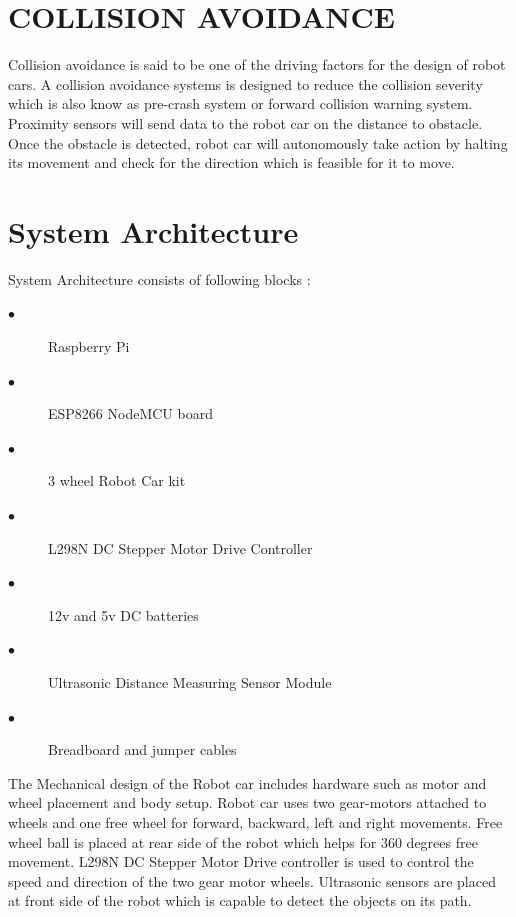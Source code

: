 \documentclass[sigconf]{acmart}
\begin{document}
\section{COLLISION AVOIDANCE}
Collision avoidance is said to be one of the driving factors for the design of robot cars. A collision avoidance systems is designed to reduce the collision severity which is also know as pre-crash system or forward collision warning system. Proximity sensors will send data to the robot car on the distance to obstacle. Once the obstacle is detected, robot  car will autonomously take action by halting its movement and check for the direction which is feasible for it to move. 

\section{System Architecture}
System Architecture consists of following blocks :
\begin{description}
    \item[$\bullet$] Raspberry Pi

    \item[$\bullet$] ESP8266 NodeMCU board

    \item[$\bullet$] 3 wheel Robot Car kit

    \item[$\bullet$] L298N DC Stepper Motor Drive Controller 

    \item[$\bullet$] 12v and 5v DC batteries
    
    \item[$\bullet$] Ultrasonic Distance Measuring Sensor Module 
    
    \item[$\bullet$] Breadboard and jumper cables
    
\end{description}

The Mechanical design of the Robot car includes hardware such as motor and wheel placement and body setup. Robot car uses two gear-motors attached to wheels and one free wheel for forward, backward, left and right movements. Free wheel ball is placed at rear side of the robot which helps for 360 degrees free movement. L298N DC Stepper Motor Drive controller is used to control the speed and direction of the two gear motor wheels. Ultrasonic sensors are placed at front side of the robot which is capable to detect the objects on its path.
\end{document}
